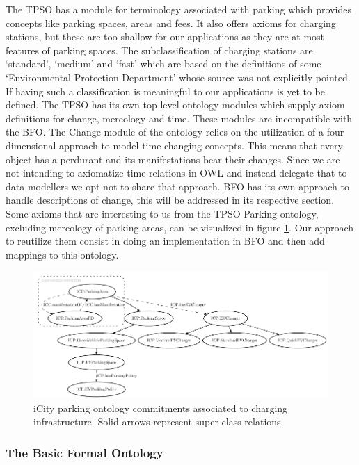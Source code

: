 The TPSO has a module for terminology associated with parking which provides
concepts like parking spaces, areas and fees. It also offers axioms for
charging stations, but these are too shallow for our applications as they are
at most features of parking spaces. The subclassification of charging stations
are `standard', `medium' and `fast' which are based on the definitions of some
`Environmental Protection Department' whose source was not explicitly pointed.
If having such a classification is meaningful to our applications is yet to be
defined. The TPSO has its own top-level ontology modules which supply axiom
definitions for change, mereology and time. These modules are incompatible with
the BFO. The Change module of the ontology relies on the utilization of a four
dimensional approach to model time changing concepts. This means that every
object has a perdurant and its manifestations bear their changes. Since we are
not intending to axiomatize time relations in OWL and instead delegate that to
data modellers we opt not to share that approach. BFO has its own approach to
handle descriptions of change, this will be addressed in its respective
section. Some axioms that are interesting to us from the TPSO Parking ontology,
excluding mereology of parking areas, can be visualized in figure
\ref{parkingfig}. Our approach to reutilize them consist in doing an
implementation in BFO and then add mappings to this ontology. 

\begin{figure}[h]
    \centering
    \includegraphics{images/PARKING.pdf}
    \caption{iCity parking ontology commitments associated to charging infrastructure. Solid arrows represent super-class relations.}
    \label{parkingfig}
\end{figure}

\subsubsection{The Basic Formal Ontology}
\label{upperlevel}

